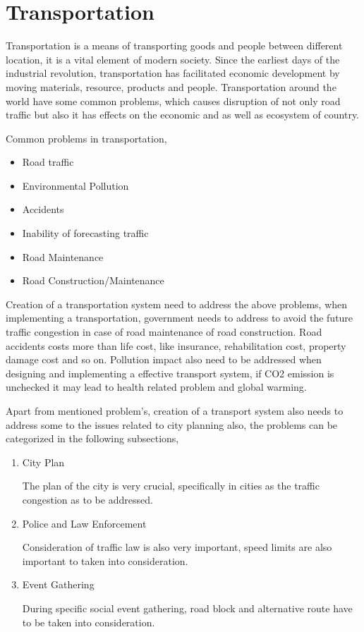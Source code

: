 \documentclass[sigconf]{acmart}
\begin{document}
\section{Transportation}

Transportation is a means of transporting goods and people between different location, it is a vital element of modern society. Since the earliest days of the industrial revolution, transportation has facilitated economic development by moving materials, resource, products and people\cite{trans}. Transportation around the world have some common problems, which causes disruption of not only road traffic but also it has effects on the economic and as well as ecosystem of country.

Common problems in transportation,

\begin{itemize}
\item Road traffic
\item Environmental Pollution
\item Accidents
\item Inability of forecasting traffic
\item Road Maintenance
\item Road Construction/Maintenance 
\end{itemize}

Creation of a transportation system need to address the above problems, when implementing a transportation, government needs to address to avoid the future traffic congestion in case of road maintenance of road construction. Road accidents costs more than life cost, like insurance, rehabilitation cost, property damage cost and so on. Pollution impact also need to be addressed when designing and implementing a effective transport system, if CO2 emission is unchecked it may lead to health related problem and global warming.

Apart from mentioned problem's, creation of a transport system also needs to address some to the issues related to city planning also, the problems can be categorized in the following subsections,

\begin{enumerate}
\item City Plan 

The plan of the city is very crucial, specifically in cities as the traffic congestion as to be addressed. 

\item Police and Law Enforcement 

Consideration of traffic law is also very important, speed limits are also important to taken into consideration.

\item Event Gathering 

During specific social event gathering, road block and alternative route have to be taken into consideration.

\end{enumerate}
\end{document}
